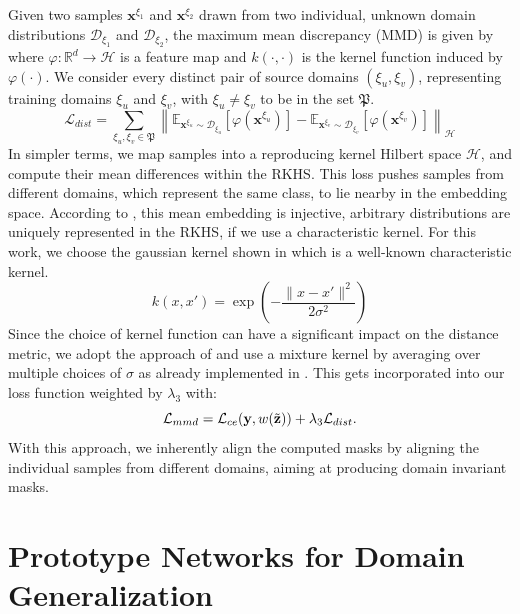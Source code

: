 Given two samples $\mathbf{x}^{\xi_1}$ and $\mathbf{x}^{\xi_2}$ drawn from two individual, unknown  domain distributions $\mathcal{D}_{\xi_1}$ and $\mathcal{D}_{\xi_2}$, the maximum mean discrepancy (MMD) is given by  where $\varphi: \mathbb{R}^{d} \rightarrow \mathcal{H}$ is a feature map and $k(\cdot, \cdot)$ is the kernel function induced by $\varphi(\cdot)$. We consider every distinct pair of source domains $(\xi_u, \xi_v)$, representing training domains $\xi_u$ and $\xi_v$, with $\xi_u\neq \xi_v$ to be in the set $\mathfrak{P}$.
\begin{equation}
\label{eq:mmd_maps}
    \mathcal{L}_{dist} =\sum_{\xi_u,\xi_v \in \mathfrak{P}}\left\|\mathbb{E}_{\mathbf{x}^{\xi_u} \sim \mathcal{D}_{\xi_u}}[\varphi(\mathbf{x}^{\xi_u})]-\mathbb{E}_{\mathbf{x}^{\xi_v} \sim \mathcal{D}_{\xi_v}}[\varphi(\mathbf{x}^{\xi_v})]\right\|_{\mathcal{H}}
\end{equation}
In simpler terms, we map samples into a reproducing kernel Hilbert space $\mathcal{H}$, and compute their mean differences within the RKHS. This loss pushes samples from different domains, which represent the same class, to lie nearby in the embedding space. According to \citet{SriperumbudurFGLS09}, this mean embedding is injective, \ie arbitrary distributions are uniquely represented in the RKHS, if we use a characteristic kernel. For this work, we choose the gaussian kernel shown in  which is a well-known characteristic kernel.
\begin{equation}
\label{eq:gaussian_kernel}
    k(x,x') = \exp \left(-\frac{\|x-x'\|^{2}}{2 \sigma^{2}}\right)
\end{equation}
Since the choice of kernel function can have a significant impact on the distance metric, we adopt the approach of \citet{LiPWK18} and use a mixture kernel by averaging over multiple choices of $\sigma$ as already implemented in \domainbed. This gets incorporated into our loss function weighted by $\lambda_3$ with:
\begin{equation}
    \mathcal{L}_{mmd} = \mathcal{L}_{ce}(\mathbf{y}, w(\Tilde{\mathbf{z}}))+\lambda_3 \mathcal{L}_{dist}.
\end{equation}
With this approach, we inherently align the computed masks by aligning the individual samples from different domains, aiming at producing domain invariant masks. 

\section{Prototype Networks for Domain Generalization}
\label{sec:prototype_networks}

